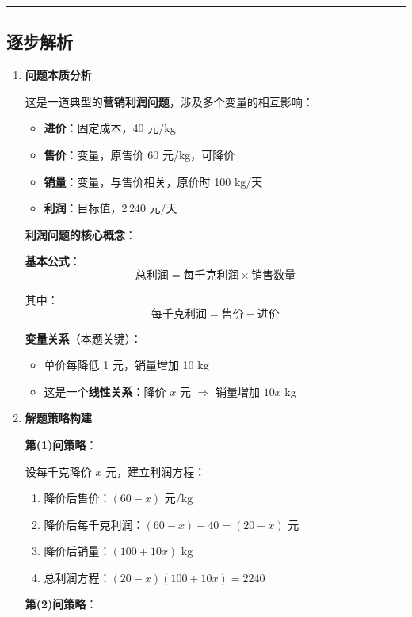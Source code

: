 \documentclass[UTF8]{ctexart}
\newenvironment{redenv}{\color{red}}{}
\newenvironment{detailedanalysis}{%
    \color{red}
    \begin{enumerate}[label=\textbf{第\arabic*步：}, leftmargin=*, align=left, itemsep=1.5ex]
}{%
    \end{enumerate}
}
\newenvironment{conceptbox}{%
    \begin{tcolorbox}[colback=red!5, colframe=red!50!black, title=概念解析, fonttitle=\bfseries]
}{%
    \end{tcolorbox}
}
\newcommand{\analysisrule}{\noindent\rule{\textwidth}{0.8pt}\vspace{-0.8em}}
\begin{document}
\begin{redenv}
\analysisrule
\subsection*{逐步解析}

\begin{detailedanalysis}
\item \textbf{问题本质分析}

这是一道典型的\textbf{营销利润问题}，涉及多个变量的相互影响：
\begin{itemize}
    \item \textbf{进价}：固定成本，40 元/kg
    \item \textbf{售价}：变量，原售价 60 元/kg，可降价
    \item \textbf{销量}：变量，与售价相关，原价时 100 kg/天
    \item \textbf{利润}：目标值，2\,240 元/天
\end{itemize}

\begin{conceptbox}
\textbf{利润问题的核心概念}：

\textbf{基本公式}：
\[
\text{总利润} = \text{每千克利润} \times \text{销售数量}
\]

其中：
\[
\text{每千克利润} = \text{售价} - \text{进价}
\]

\textbf{变量关系}（本题关键）：
\begin{itemize}
    \item 单价每降低 1 元，销量增加 10 kg
    \item 这是一个\textbf{线性关系}：降价 $x$ 元 $\Rightarrow$ 销量增加 $10x$ kg
\end{itemize}
\end{conceptbox}

\item \textbf{解题策略构建}

\noindent\textbf{第(1)问策略}：

设每千克降价 $x$ 元，建立利润方程：
\begin{enumerate}[label=(\alph*)]
    \item 降价后售价：$(60 - x)$ 元/kg
    \item 降价后每千克利润：$(60 - x) - 40 = (20 - x)$ 元
    \item 降价后销量：$(100 + 10x)$ kg
    \item 总利润方程：$(20 - x)(100 + 10x) = 2240$
\end{enumerate}

\noindent\textbf{第(2)问策略}：


\end{detailedanalysis}
\end{redenv}
\end{document}
